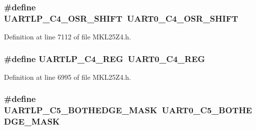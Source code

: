\subsubsection[{\texorpdfstring{U\+A\+R\+T\+L\+P\+\_\+\+C4\+\_\+\+O\+S\+R\+\_\+\+S\+H\+I\+FT}{UARTLP_C4_OSR_SHIFT}}]{\setlength{\rightskip}{0pt plus 5cm}\#define U\+A\+R\+T\+L\+P\+\_\+\+C4\+\_\+\+O\+S\+R\+\_\+\+S\+H\+I\+FT~{\bf U\+A\+R\+T0\+\_\+\+C4\+\_\+\+O\+S\+R\+\_\+\+S\+H\+I\+FT}}\hypertarget{group___backward___compatibility___symbols_gafb1dd8f9e942cb49f32e0be294bee876}{}\label{group___backward___compatibility___symbols_gafb1dd8f9e942cb49f32e0be294bee876}


Definition at line 7112 of file M\+K\+L25\+Z4.\+h.

\subsubsection[{\texorpdfstring{U\+A\+R\+T\+L\+P\+\_\+\+C4\+\_\+\+R\+EG}{UARTLP_C4_REG}}]{\setlength{\rightskip}{0pt plus 5cm}\#define U\+A\+R\+T\+L\+P\+\_\+\+C4\+\_\+\+R\+EG~{\bf U\+A\+R\+T0\+\_\+\+C4\+\_\+\+R\+EG}}\hypertarget{group___backward___compatibility___symbols_gaf72e56d7ea7d8a9c232d8ec3660b7451}{}\label{group___backward___compatibility___symbols_gaf72e56d7ea7d8a9c232d8ec3660b7451}


Definition at line 6995 of file M\+K\+L25\+Z4.\+h.

\subsubsection[{\texorpdfstring{U\+A\+R\+T\+L\+P\+\_\+\+C5\+\_\+\+B\+O\+T\+H\+E\+D\+G\+E\+\_\+\+M\+A\+SK}{UARTLP_C5_BOTHEDGE_MASK}}]{\setlength{\rightskip}{0pt plus 5cm}\#define U\+A\+R\+T\+L\+P\+\_\+\+C5\+\_\+\+B\+O\+T\+H\+E\+D\+G\+E\+\_\+\+M\+A\+SK~{\bf U\+A\+R\+T0\+\_\+\+C5\+\_\+\+B\+O\+T\+H\+E\+D\+G\+E\+\_\+\+M\+A\+SK}}\hypertarget{group___backward___compatibility___symbols_ga6b248448b3fc7bf345c7a75bec3b8aa3}{}\label{group___backward___compatibility___symbols_ga6b248448b3fc7bf345c7a75bec3b8aa3}


